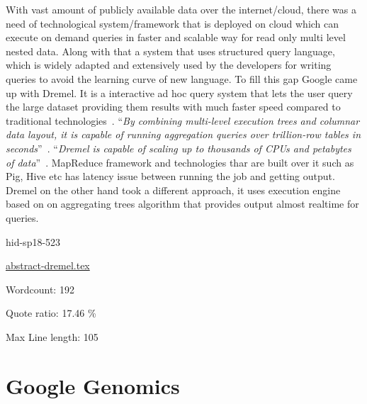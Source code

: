 With vast amount of publicly available data over the internet/cloud, 
there was a need of technological system/framework that is deployed on 
cloud which can execute on demand queries in faster and scalable way 
for read only multi level nested data. Along with that a system that 
uses structured query language, which is widely adapted and extensively 
used by the developers for writing queries to avoid the learning curve of 
new language. To fill this gap Google came up with Dremel. It is a 
interactive ad hoc query system that lets the user query the large 
dataset providing them results with much faster speed compared to 
traditional technologies~\cite{hid-sp18-523-www-dremel}. \color{blue}``\emph{By combining 
multi-level execution trees and columnar data layout, it is capable of 
running aggregation queries over trillion-row tables in 
seconds}''\color{black}~\cite{hid-sp18-523-www-dremel}. \color{blue}``\emph{Dremel is capable of scaling 
up to thousands of CPUs and petabytes of data}''\color{black}~\cite{hid-sp18-523-www-dremel}.
MapReduce framework and technologies thar are built over it such as Pig, Hive 
etc has latency issue between running the job and getting output. 
Dremel on the other hand took a different approach, it uses execution engine
based on on aggregating trees algorithm that provides output almost realtime 
for queries.


\begin{IU}

hid-sp18-523

\href{https://github.com/cloudmesh-community/hid-sp18-523/blob/master//technology/abstract-dremel.tex}{abstract-dremel.tex}

 

Wordcount: 192


Quote ratio: 17.46 \%
 
Max Line length: 105
\end{IU}

\section{Google Genomics}

